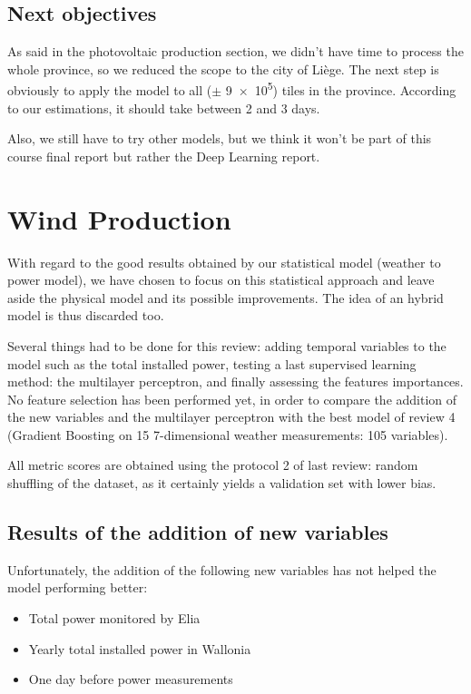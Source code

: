 \documentclass[a4paper, 12pt]{article}
\begin{document}
\subsection{Next objectives}

As said in the photovoltaic production section, we didn't have time to process the whole province, so we reduced the scope to the city of Liège. The next step is obviously to apply the model to all ($\pm$ \num{9e5}) tiles in the province. According to our estimations, it should take between 2 and 3 days.

Also, we still have to try other models, but we think it won't be part of this course final report but rather the Deep Learning report.

\newpage

\section{Wind Production}

With regard to the good results obtained by our statistical model (weather to power model), we have chosen to focus on this statistical approach and leave aside the physical model and its possible improvements. The idea of an hybrid model is thus discarded too.

Several things had to be done for this review: adding temporal variables to the model such as the total installed power, testing a last supervised learning method: the multilayer perceptron, and finally assessing the features importances. No feature selection has been performed yet, in order to compare the addition of the new variables and the multilayer perceptron with the best model of review 4 (Gradient Boosting on 15 7-dimensional weather measurements: 105 variables).

All metric scores are obtained using the protocol 2 of last review: random shuffling of the dataset, as it certainly yields a validation set with lower bias.

\subsection{Results of the addition of new variables}

Unfortunately, the addition of the following new variables has not helped the model performing better: 
\begin{itemize}
    \item Total power monitored by Elia
    \item Yearly total installed power in Wallonia
    \item One day before power measurements
\end{itemize}
\end{document}
